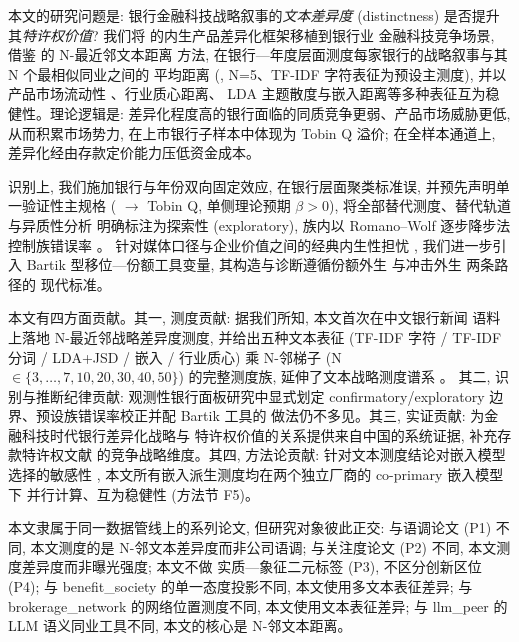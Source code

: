 本文的研究问题是: 银行金融科技战略叙事的\emph{文本差异度}
(distinctness) 是否提升其\emph{特许权价值}?
我们将 \textcite{hoberg2016tnic} 的内生产品差异化框架移植到银行业
金融科技竞争场景, 借鉴 \textcite{guzman2023strategy} 的 N-最近邻文本距离
方法, 在银行—年度层面测度每家银行的战略叙事与其 N 个最相似同业之间的
平均距离 (, N=5、TF-IDF 字符表征为预设主测度),
并以产品市场流动性 \parencite{hoberg2014fluidity}、行业质心距离、
LDA 主题散度与嵌入距离等多种表征互为稳健性。理论逻辑是:
差异化程度高的银行面临的同质竞争更弱、产品市场威胁更低,
从而积累市场势力, 在上市银行子样本中体现为 Tobin Q 溢价;
在全样本通道上, 差异化经由存款定价能力压低资金成本。

识别上, 我们施加银行与年份双向固定效应, 在银行层面聚类标准误,
并预先声明单一验证性主规格 ( $\to$ Tobin Q,
单侧理论预期 $\beta>0$), 将全部替代测度、替代轨道与异质性分析
明确标注为探索性 (exploratory), 族内以 Romano--Wolf 逐步降步法
控制族错误率 \parencite{romano2005stepwise,list2019multiplehypothesis}。
针对媒体口径与企业价值之间的经典内生性担忧 \parencite{gurun2012hype},
我们进一步引入 Bartik 型移位—份额工具变量, 其构造与诊断遵循份额外生
\parencite{goldsmith2020bartik} 与冲击外生
\parencite{borusyak2022shiftshare,borusyak2025shiftshareguide} 两条路径的
现代标准。

本文有四方面贡献。其一, 测度贡献: 据我们所知, 本文首次在中文银行新闻
语料上落地 N-最近邻战略差异度测度, 并给出五种文本表征
(TF-IDF 字符 / TF-IDF 分词 / LDA+JSD / 嵌入 / 行业质心) 乘
N-邻梯子 (N$\in\{3,\dots,7,10,20,30,40,50\}$) 的完整测度族,
延伸了文本战略测度谱系
\parencite{guzman2023strategy,bellstam2021innovation,banker2024strategy,hoberg2025scope}。
其二, 识别与推断纪律贡献: 观测性银行面板研究中显式划定
confirmatory/exploratory 边界、预设族错误率校正并配 Bartik 工具的
做法仍不多见。其三, 实证贡献: 为金融科技时代银行差异化战略与
特许权价值的关系提供来自中国的系统证据, 补充存款特许权文献
\parencite{drechsler2026franchise} 的竞争战略维度。其四, 方法论贡献:
针对文本测度结论对嵌入模型选择的敏感性 \parencite{ganguli2024patenttext},
本文所有嵌入派生测度均在两个独立厂商的 co-primary 嵌入模型下
并行计算、互为稳健性 (方法节 F5)。

本文隶属于同一数据管线上的系列论文, 但研究对象彼此正交:
与语调论文 (P1) 不同, 本文测度的是 N-邻文本差异度而非公司语调;
与关注度论文 (P2) 不同, 本文测度差异度而非曝光强度; 本文不做
实质—象征二元标签 (P3), 不区分创新区位 (P4); 与 benefit\_society
的单一态度投影不同, 本文使用多文本表征差异; 与 brokerage\_network
的网络位置测度不同, 本文使用文本表征差异; 与 llm\_peer 的 LLM
语义同业工具不同, 本文的核心是 N-邻文本距离。

